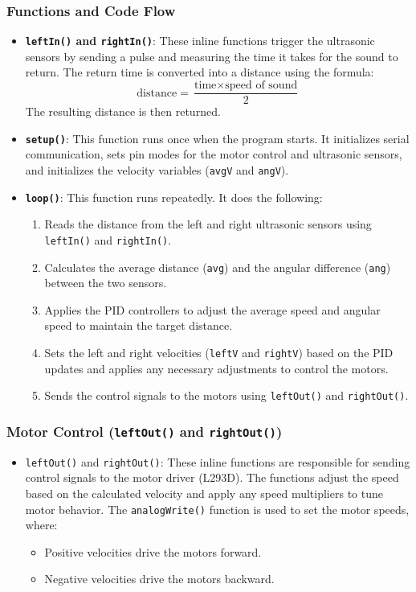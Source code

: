 \documentclass[a4paper,12pt]{article}
\begin{document}
\subsubsection{Functions and Code Flow}
\begin{itemize}
\item \textbf{\texttt{leftIn()} and \texttt{rightIn()}}: These inline functions trigger the ultrasonic sensors by sending a pulse and measuring the time it takes for the sound to return. The return time is converted into a distance using the formula:
\[
\text{distance} = \frac{\text{time} \times \text{speed of sound}}{2}
\]
The resulting distance is then returned.
\item \textbf{\texttt{setup()}}: This function runs once when the program starts. It initializes serial communication, sets pin modes for the motor control and ultrasonic sensors, and initializes the velocity variables (\texttt{avgV} and \texttt{angV}).
\item \textbf{\texttt{loop()}}: This function runs repeatedly. It does the following:
\begin{enumerate}
\item Reads the distance from the left and right ultrasonic sensors using \texttt{leftIn()} and \texttt{rightIn()}.
\item Calculates the average distance (\texttt{avg}) and the angular difference (\texttt{ang}) between the two sensors.
\item Applies the PID controllers to adjust the average speed and angular speed to maintain the target distance.
\item Sets the left and right velocities (\texttt{leftV} and \texttt{rightV}) based on the PID updates and applies any necessary adjustments to control the motors.
\item Sends the control signals to the motors using \texttt{leftOut()} and \texttt{rightOut()}.
\end{enumerate}
\end{itemize}
\subsubsection{Motor Control (\texttt{leftOut()} and \texttt{rightOut()})}
\begin{itemize}
\item \texttt{leftOut()} and \texttt{rightOut()}: These inline functions are responsible for sending control signals to the motor driver (L293D). The functions adjust the speed based on the calculated velocity and apply any speed multipliers to tune motor behavior. The \texttt{analogWrite()} function is used to set the motor speeds, where:
\begin{itemize}
\item Positive velocities drive the motors forward.
\item Negative velocities drive the motors backward.
\end{itemize}
\end{itemize}
\end{document}
